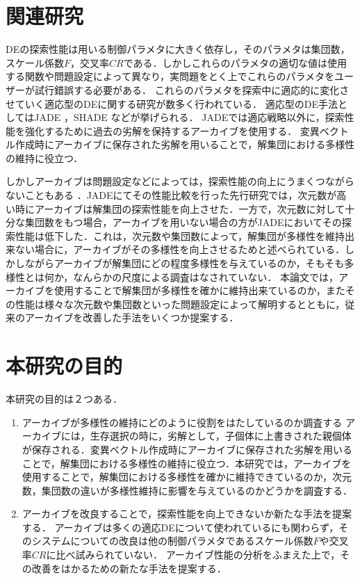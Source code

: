 \documentclass[a4paper,11pt,oneside,openany]{jsbook}
\begin{document}
\section{関連研究}
DEの探索性能は用いる制御パラメタに大きく依存し，そのパラメタは集団数，スケール係数$F$，交叉率$CR$である．しかしこれらのパラメタの適切な値は使用する関数や問題設定によって異なり，実問題をとく上でこれらのパラメタをユーザーが試行錯誤する必要がある．
これらのパラメタを探索中に適応的に変化させていく適応型のDEに関する研究が数多く行われている．
適応型のDE手法としてはJADE \cite{JADE} ，SHADE \cite{SHADE} などが挙げられる．
JADEでは適応戦略以外に，探索性能を強化するために過去の劣解を保持するアーカイブを使用する．
変異ベクトル作成時にアーカイブに保存された劣解を用いることで，解集団における多様性の維持に役立つ．

しかしアーカイブは問題設定などによっては，探索性能の向上にうまくつながらないこともある \cite{JADE} ．JADEにてその性能比較を行った先行研究では，次元数が高い時にアーカイブは解集団の探索性能を向上させた．一方で，次元数に対して十分な集団数をもつ場合，アーカイブを用いない場合の方がJADEにおいてその探索性能は低下した．これは，次元数や集団数によって，解集団が多様性を維持出来ない場合に，アーカイブがその多様性を向上させるためと述べられている．しかしながらアーカイブが解集団にどの程度多様性を与えているのか，そもそも多様性とは何か，なんらかの尺度による調査はなされていない．
本論文では，アーカイブを使用することで解集団が多様性を確かに維持出来ているのか，またその性能は様々な次元数や集団数といった問題設定によって解明するとともに，従来のアーカイブを改善した手法をいくつか提案する．

\section{本研究の目的}
本研究の目的は２つある．
\begin{enumerate}
\item アーカイブが多様性の維持にどのように役割をはたしているのか調査する
\vspace{3mm}
\newline
アーカイブには，生存選択の時に，劣解として，子個体に上書きされた親個体が保存される．変異ベクトル作成時にアーカイブに保存された劣解を用いることで，解集団における多様性の維持に役立つ．本研究では，アーカイブを使用することで，解集団における多様性を確かに維持できているのか，次元数，集団数の違いが多様性維持に影響を与えているのかどうかを調査する．
\newline


\item アーカイブを改良することで，探索性能を向上できないか新たな手法を提案する．
\vspace{3mm}
\newline
アーカイブは多くの適応DEについて使われているにも関わらず，そのシステムについての改良は他の制御パラメタであるスケール係数$F$や交叉率$CR$に比べ試みられていない．
アーカイブ性能の分析をふまえた上で，その改善をはかるための新たな手法を提案する．
\end{enumerate}
\end{document}
